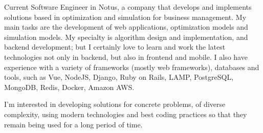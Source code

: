 

\begin{cvparagraph}

Current Software Engineer in Notus, a company that develops and implements solutions based in optimization and simulation for business management. My main tasks are the development of web applications, optimization models and simulation models. My specialty is algorithm design and implementation, and backend development; but I certainly love to learn and work the latest technologies not only in backend, but also in frontend and mobile. I also have experience with a variety of frameworks (mostly web frameworks), databases and tools, such as Vue, NodeJS, Django, Ruby on Rails, LAMP, PostgreSQL, MongoDB, Redis, Docker, Amazon AWS.

I'm interested in developing solutions for concrete problems, of diverse complexity, using modern technologies and best coding practices so that they remain being used for a long period of time.

\end{cvparagraph}

